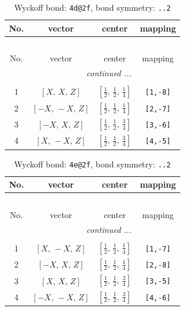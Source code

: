 \documentclass[fleqn,8pt]{jsarticle}
\begin{document}
\begin{longtable}{cccc}
\caption{Wyckoff bond: {\tt 4d@2f}, bond symmetry: {\tt ..2}}
 \\
 \hline \hline
No. & vector & center & mapping \\ \hline \endfirsthead

\multicolumn{3}{l}{\tablename\ \thetable{}} \\
 \hline \hline
No. & vector & center & mapping \\ \hline \endhead

 \hline \hline
\multicolumn{3}{r}{\footnotesize\it continued ...} \\ \endfoot

 \hline \hline
\multicolumn{3}{r}{} \\ \endlastfoot

1 & $\left[ X,\, X,\, Z \right]$ & $\left[ \frac{1}{2},\, \frac{1}{2},\, \frac{1}{4} \right]$ & {\tt [1,-8]} \\ \hline
2 & $\left[ - X,\, - X,\, Z \right]$ & $\left[ \frac{1}{2},\, \frac{1}{2},\, \frac{1}{4} \right]$ & {\tt [2,-7]} \\ \hline
3 & $\left[ - X,\, X,\, Z \right]$ & $\left[ \frac{1}{2},\, \frac{1}{2},\, \frac{3}{4} \right]$ & {\tt [3,-6]} \\ \hline
4 & $\left[ X,\, - X,\, Z \right]$ & $\left[ \frac{1}{2},\, \frac{1}{2},\, \frac{3}{4} \right]$ & {\tt [4,-5]} \\
\end{longtable}
\renewcommand{\arraystretch}{1.2}
\begin{longtable}{cccc}
\caption{Wyckoff bond: {\tt 4e@2f}, bond symmetry: {\tt ..2}}
 \\
 \hline \hline
No. & vector & center & mapping \\ \hline \endfirsthead

\multicolumn{3}{l}{\tablename\ \thetable{}} \\
 \hline \hline
No. & vector & center & mapping \\ \hline \endhead

 \hline \hline
\multicolumn{3}{r}{\footnotesize\it continued ...} \\ \endfoot

 \hline \hline
\multicolumn{3}{r}{} \\ \endlastfoot

1 & $\left[ X,\, - X,\, Z \right]$ & $\left[ \frac{1}{2},\, \frac{1}{2},\, \frac{1}{4} \right]$ & {\tt [1,-7]} \\ \hline
2 & $\left[ - X,\, X,\, Z \right]$ & $\left[ \frac{1}{2},\, \frac{1}{2},\, \frac{1}{4} \right]$ & {\tt [2,-8]} \\ \hline
3 & $\left[ X,\, X,\, Z \right]$ & $\left[ \frac{1}{2},\, \frac{1}{2},\, \frac{3}{4} \right]$ & {\tt [3,-5]} \\ \hline
4 & $\left[ - X,\, - X,\, Z \right]$ & $\left[ \frac{1}{2},\, \frac{1}{2},\, \frac{3}{4} \right]$ & {\tt [4,-6]} \\
\end{longtable}
\end{document}
